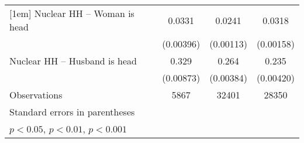 {\begin{tabular}{l*{3}{c}}
[1em]
Nuclear HH – Woman is head&      0.0331\sym{***}&      0.0241\sym{***}&      0.0318\sym{***}\\
                    &   (0.00396)         &   (0.00113)         &   (0.00158)         \\
[1em]
Nuclear HH – Husband is head&       0.329\sym{***}&       0.264\sym{***}&       0.235\sym{***}\\
                    &   (0.00873)         &   (0.00384)         &   (0.00420)         \\
\hline
Observations        &        5867         &       32401         &       28350         \\
\hline\hline
\multicolumn{4}{l}{\footnotesize Standard errors in parentheses}\\
\multicolumn{4}{l}{\footnotesize \sym{*} \(p<0.05\), \sym{**} \(p<0.01\), \sym{***} \(p<0.001\)}\\
\end{tabular}
}

